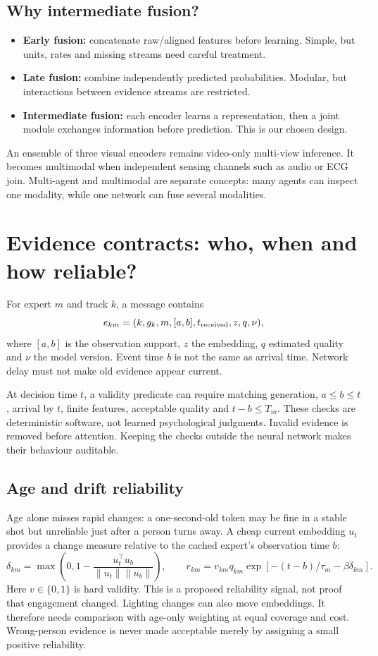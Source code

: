 \documentclass[10pt,a4paper]{article}
\begin{document}
\subsection{Why intermediate fusion?}
\begin{itemize}
\item \textbf{Early fusion:} concatenate raw/aligned features before learning. Simple, but units, rates and missing streams need careful treatment.
\item \textbf{Late fusion:} combine independently predicted probabilities. Modular, but interactions between evidence streams are restricted.
\item \textbf{Intermediate fusion:} each encoder learns a representation, then a joint module exchanges information before prediction. This is our chosen design.
\end{itemize}
An ensemble of three visual encoders remains video-only multi-view inference. It becomes multimodal when independent sensing channels such as audio or ECG join. Multi-agent and multimodal are separate concepts: many agents can inspect one modality, while one network can fuse several modalities.

\section{Evidence contracts: who, when and how reliable?}
For expert $m$ and track $k$, a message contains
\begin{equation}
e_{km}=(k,g_k,m,[a,b],t_{\rm received},z,q,\nu),
\end{equation}
where $[a,b]$ is the observation support, $z$ the embedding, $q$ estimated quality and $\nu$ the model version. Event time $b$ is not the same as arrival time. Network delay must not make old evidence appear current.

At decision time $t$, a validity predicate can require matching generation, $a\leq b\leq t$, arrival by $t$, finite features, acceptable quality and $t-b\leq T_m$. These checks are deterministic software, not learned psychological judgments. Invalid evidence is removed before attention. Keeping the checks outside the neural network makes their behaviour auditable.

\subsection{Age and drift reliability}
Age alone misses rapid changes: a one-second-old token may be fine in a stable shot but unreliable just after a person turns away. A cheap current embedding $u_t$ provides a change measure relative to the cached expert's observation time $b$:
\begin{equation}
\delta_{km}=\max\!\left(0,1-\frac{u_t^\top u_b}{\|u_t\|\|u_b\|}\right),\qquad
r_{km}=v_{km}q_{km}\exp[-(t-b)/\tau_m-\beta\delta_{km}].
\end{equation}
Here $v\in\{0,1\}$ is hard validity. This is a proposed reliability signal, not proof that engagement changed. Lighting changes can also move embeddings. It therefore needs comparison with age-only weighting at equal coverage and cost. Wrong-person evidence is never made acceptable merely by assigning a small positive reliability.
\end{document}
